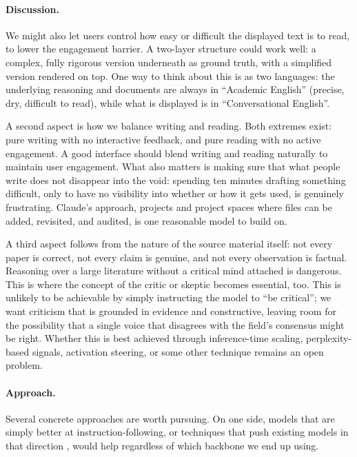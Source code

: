 \paragraph{Discussion.}
We might also let users control how easy or difficult the displayed text is to read, to lower the engagement barrier. A two-layer structure could work well: a complex, fully rigorous version underneath as ground truth, with a simplified version rendered on top. One way to think about this is as two languages: the underlying reasoning and documents are always in ``Academic English'' (precise, dry, difficult to read), while what is displayed is in ``Conversational English''.

A second aspect is how we balance writing and reading. Both extremes exist: pure writing with no interactive feedback, and pure reading with no active engagement. A good interface should blend writing and reading naturally to maintain user engagement. What also matters is making sure that what people write does not disappear into the void: spending ten minutes drafting something difficult, only to have no visibility into whether or how it gets used, is genuinely frustrating. Claude's approach, projects and project spaces where files can be added, revisited, and audited, is one reasonable model to build on.

A third aspect follows from the nature of the source material itself: not every paper is correct, not every claim is genuine, and not every observation is factual. Reasoning over a large literature without a critical mind attached is dangerous. This is where the concept of the critic or skeptic becomes essential, too. This is unlikely to be achievable by simply instructing the model to ``be critical''; we want criticism that is grounded in evidence and constructive, leaving room for the possibility that a single voice that disagrees with the field's consensus might be right. Whether this is best achieved through inference-time scaling, perplexity-based signals, activation steering, or some other technique remains an open problem.

\paragraph{Approach.}
Several concrete approaches are worth pursuing. On one side, models that are simply better at instruction-following, or techniques that push existing models in that direction \cite{2604.27251}, would help regardless of which backbone we end up using.

